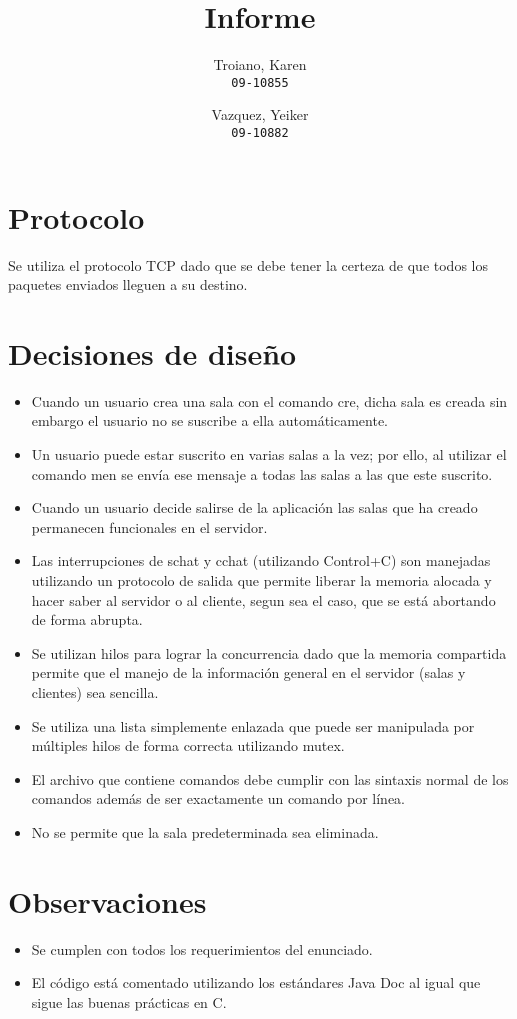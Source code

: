 \documentclass[a4paper]{article}
\title{Informe}
\author{
  Troiano, Karen\\
  \texttt{09-10855}
  \and
  Vazquez, Yeiker\\
  \texttt{09-10882}
}
\begin{document}
\maketitle

\section{Protocolo}

Se utiliza el protocolo TCP dado que se debe tener la certeza de que todos los paquetes enviados lleguen a su destino.

\section{Decisiones de diseño}
\begin{itemize}
\item Cuando un usuario crea una sala con el comando cre, dicha sala es creada sin embargo el usuario no se suscribe a ella automáticamente.
\item Un usuario puede estar suscrito en varias salas a la vez; por ello, al utilizar el comando men se envía ese mensaje a todas las salas a las que este suscrito.
\item Cuando un usuario decide salirse de la aplicación las salas que ha creado permanecen funcionales en el servidor.
\item Las interrupciones de schat y cchat (utilizando Control+C) son manejadas utilizando un protocolo de salida que permite liberar la memoria alocada y hacer saber al servidor o al cliente, segun sea el caso, que se está abortando de forma abrupta.
\item Se utilizan hilos para lograr la concurrencia dado que la memoria compartida permite que el manejo de la información general en el servidor (salas y clientes) sea sencilla.
\item Se utiliza una lista simplemente enlazada que puede ser manipulada por múltiples hilos de forma correcta utilizando mutex.
\item El archivo que contiene comandos debe cumplir con las sintaxis normal de los comandos además de ser exactamente un comando por línea.
\item No se permite que la sala predeterminada sea eliminada.
\end{itemize}

\section{Observaciones}
\begin{itemize}
\item Se cumplen con todos los requerimientos del enunciado.
\item El código está comentado utilizando los estándares Java Doc al igual que sigue las buenas prácticas en C.
\end{itemize}
\end{document}
